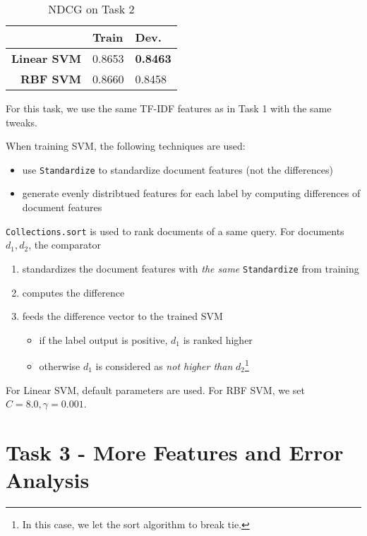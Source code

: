 \documentclass{article}
\begin{document}
\begin{table}[!htb]
    \centering
    \begin{tabular}{| r | l | l |}
        \hline
        & \textbf{Train} & \textbf {Dev.} \\
        \hline
        \textbf{Linear SVM} & 0.8653 & \textbf{0.8463} \\
        \hline
        \textbf{RBF SVM} & 0.8660 & 0.8458 \\
        \hline
    \end{tabular}
    \caption{NDCG on Task 2}
\end{table}

For this task, we use the same TF-IDF features as in Task 1 with the same tweaks.

When training SVM, the following techniques are used:

\begin{itemize}
    \item use \texttt{Standardize} to standardize document features (not the differences)
    \item generate evenly distribtued features for each label by computing differences of document features
\end{itemize}

\texttt{Collections.sort} is used to rank documents of a same query.
For documents $d_1,d_2$, the comparator

\begin{enumerate}
    \item standardizes the document features with \emph{the same} \texttt{Standardize} from training
    \item computes the difference
    \item feeds the difference vector to the trained SVM
        \begin{itemize}
            \item if the label output is positive, $d_1$ is ranked higher
            \item otherwise $d_1$ is considered as \emph{not higher than} $d_2$\footnote{In this case, we let the sort algorithm to break tie.}
        \end{itemize}
\end{enumerate}

For Linear SVM, default parameters are used. For RBF SVM, we set $C=8.0,\gamma=0.001$.

\section{Task 3 - More Features and Error Analysis}
\end{document}
